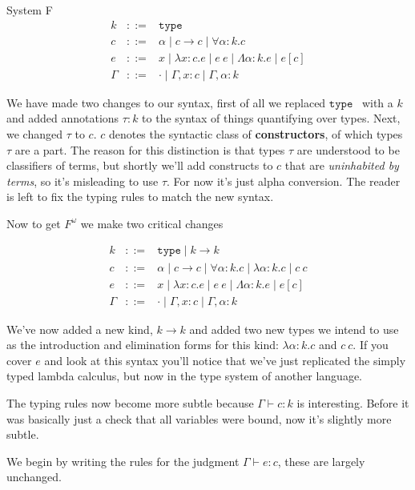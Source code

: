 \documentclass{amsart}
\newcommand{\type}{\ensuremath{\mathtt{type}}}
\begin{document}
\begin{section}{System F}
\[
\begin{array}{lcl}
  k & ::= & \type\\
  c & ::= & \alpha \mid c \to c \mid \forall \alpha : k. c\\
  e & ::= & x \mid \lambda x : c. e \mid e\ e \mid
            \Lambda \alpha : k. e \mid e[c]\\
  \Gamma & ::= & \cdot \mid \Gamma, x : c \mid \Gamma, \alpha : k
\end{array}
\]

We have made two changes to our syntax, first of all we replaced \type
\, with a $k$ and added annotations $\tau : k$ to the syntax of things
quantifying over types. Next, we changed $\tau$ to $c$. $c$ denotes the syntactic class of {\bf constructors}, of which types $\tau$ are a part. The reason for this distinction is that types $\tau$ are understood to be classifiers of terms, but shortly we'll add constructs to $c$ that are \emph{uninhabited by terms}, so it's misleading to use $\tau$. For now it's just alpha
conversion. The reader is left to fix the typing rules to match the
new syntax.

Now to get $F^\omega$ we make two critical changes

\[
\begin{array}{lcl}
  k & ::= & \type \mid k \to k\\
  c & ::= & \alpha \mid c \to c \mid \forall \alpha : k. c
            \mid \lambda \alpha : k. c \mid c\ c\\
  e & ::= & x \mid \lambda x : c. e \mid e\ e \mid
            \Lambda \alpha : k. e \mid e[c]\\
  \Gamma & ::= & \cdot \mid \Gamma, x : c \mid \Gamma, \alpha : k
\end{array}
\]

We've now added a new kind, $k \to k$ and added two new types we
intend to use as the introduction and elimination forms for this
kind: $\lambda \alpha : k. c$ and $c\ c$. If you cover $e$ and look at
this syntax you'll notice that we've just replicated the simply typed
lambda calculus, but now in the type system of another language.

The typing rules now become more subtle because $\Gamma \vdash c : k$
is interesting. Before it was basically just a check that all
variables were bound, now it's slightly more subtle.

We begin by writing the rules for the judgment $\Gamma \vdash e : c$,
these are largely unchanged.


\end{section}
\end{document}
